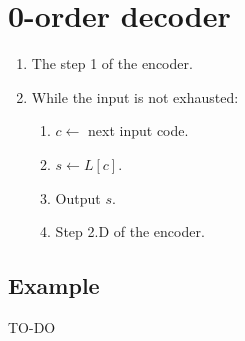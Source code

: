 \section{0-order decoder}
\begin{enumerate}
\def\labelenumi{\arabic{enumi}.}
\tightlist
\item
  The step 1 of the encoder.
\item
  While the input is not exhausted:
  \begin{enumerate}
  \def\labelenumii{\arabic{enumii}.}
  \tightlist
  \item
    \(c\leftarrow\) next input code.
  \item
    \(s\leftarrow L[c]\).
  \item
    Output \(s\).
  \item
    Step 2.D of the encoder.
  \end{enumerate}
\end{enumerate}

\subsection{Example}
TO-DO

